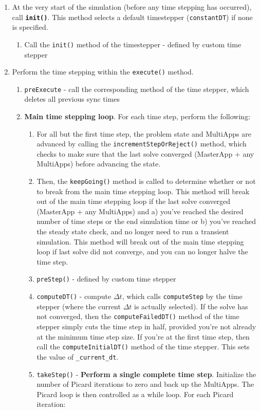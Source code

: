 \documentclass[10pt]{article}
\numberwithin{equation}{section} %
\begin{document}
\begin{enumerate}
\item At the very start of the simulation (before any time stepping has occurred), call {\bf {\tt init()}}. This method selects a default timestepper ({\tt constantDT}) if none is specified.
	\begin{enumerate}
	\item Call the {\tt init()} method of the timestepper - defined by custom time stepper
	\end{enumerate}
\item Perform the time stepping within the {\tt execute()} method.
	\begin{enumerate}
	\item {\tt preExecute} - call the corresponding method of the time stepper, which deletes all previous sync times
	\item {\bf Main time stepping loop}. For each time step, perform the following:
		\begin{enumerate}
		\item For all but the first time step, the problem state and MultiApps are advanced by calling the {\tt incrementStepOrReject()} method, which checks to make sure that the last solve converged (MasterApp + any MultiApps) before advancing the state.
		\item Then, the {\tt keepGoing()} method is called to determine whether or not to break from the main time stepping loop. This method will break out of the main time stepping loop if the last solve converged (MasterApp + any MultiApps) and a) you've reached the desired number of time steps or the end simulation time or b) you've reached the steady state check, and no longer need to run a transient simulation. This method will break out of the main time stepping loop if last solve did not converge, and you can no longer halve the time step.
		\item {\tt preStep()}  - defined by custom time stepper
		\item {\tt computeDT()} - compute \(\Delta t\), which calls {\tt computeStep} by the time stepper (where the current \(\Delta t\) is actually selected). If the solve has not converged, then the {\tt computeFailedDT()}  method of the time stepper simply cuts the time step in half, provided you're not  already at the minimum time step size. If you're at the first time step, then call the {\tt computeInitialDT()} method of the time stepper. This sets the value of {\tt \_current\_dt}.
		\item {\tt takeStep()} - {\bf Perform a single complete time step}. Initialize the number of Picard iterations to zero and back up the MultiApps. The Picard loop is then controlled as a while loop. For each Picard iteration:

\end{enumerate}
\end{enumerate}
\end{enumerate}
\end{document}
